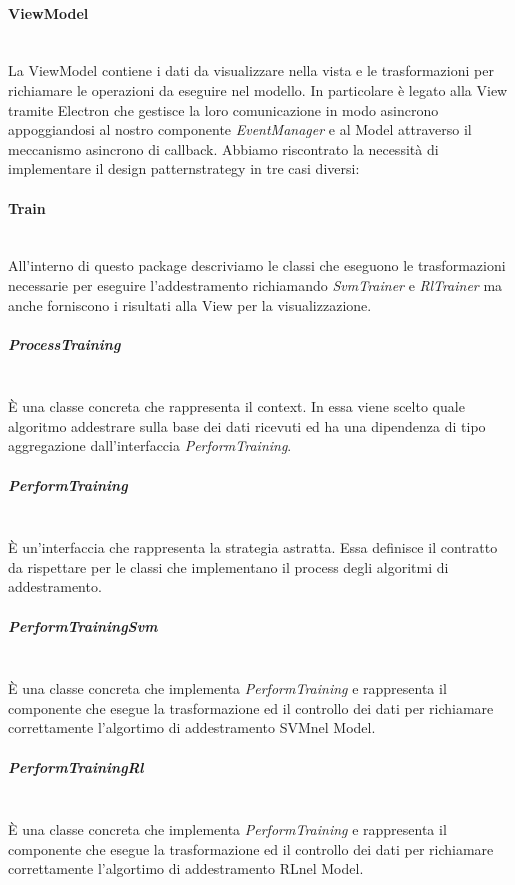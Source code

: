 	
		\paragraph{ViewModel} \mbox{} \\[1mm]
		La ViewModel contiene i dati da visualizzare nella vista e le trasformazioni per richiamare le operazioni da eseguire nel modello.
		In particolare è legato alla View tramite Electron che gestisce la loro comunicazione in modo asincrono appoggiandosi al nostro componente \textit{EventManager} e al Model attraverso il meccanismo asincrono di callback.
		Abbiamo riscontrato la necessità di implementare il design pattern\glosp strategy in tre casi diversi:
		\paragraph*{Train} \mbox{} \\[1mm]
		All'interno di questo package descriviamo le classi che eseguono le trasformazioni necessarie per eseguire l'addestramento richiamando \textit{SvmTrainer} e \textit{RlTrainer} ma anche forniscono i risultati alla View per la visualizzazione.
		\subparagraph*{ProcessTraining} \mbox{} \\[1mm]
		È una classe concreta che rappresenta il context. In essa viene scelto quale algoritmo addestrare sulla base dei dati ricevuti ed ha una dipendenza di tipo aggregazione dall'interfaccia \textit{PerformTraining}.
		\subparagraph*{PerformTraining} \mbox{} \\[1mm]
		È un'interfaccia che rappresenta la strategia astratta. Essa definisce il contratto da rispettare per le classi che implementano il process degli algoritmi di addestramento.
		\subparagraph*{PerformTrainingSvm} \mbox{} \\[1mm]
		È una classe concreta che implementa \textit{PerformTraining} e rappresenta il componente che esegue la trasformazione ed il controllo dei dati per richiamare correttamente l'algortimo di addestramento SVM\glosp nel Model.
		\subparagraph*{PerformTrainingRl} \mbox{} \\[1mm]
		È una classe concreta che implementa \textit{PerformTraining} e rappresenta il componente che esegue la trasformazione ed il controllo dei dati per richiamare correttamente l'algortimo di addestramento RL\glosp nel Model.
		\mbox{}
